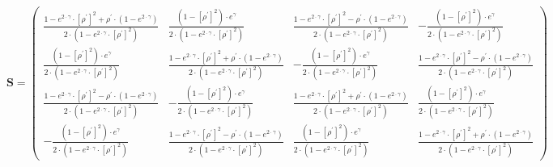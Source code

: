 \[ \mathbf{S} = \left(\begin{smallmatrix} \frac{ 1 - e^{2 \cdot \gamma
}  \cdot \left[ \rho^\prime \right]^2 + \rho^\prime \cdot \left( 1 -
e^{2 \cdot \gamma }  \right) }{ 2 \cdot \left( 1 - e^{2 \cdot \gamma }
\cdot \left[ \rho^\prime \right]^2 \right) }  & \frac{ \left( 1 -
\left[ \rho^\prime \right]^2 \right) \cdot e^{\gamma }  }{ 2 \cdot
\left( 1 - e^{2 \cdot \gamma }  \cdot \left[ \rho^\prime \right]^2
\right) }  & \frac{ 1 - e^{2 \cdot \gamma }  \cdot \left[ \rho^\prime
\right]^2 - \rho^\prime \cdot \left( 1 - e^{2 \cdot \gamma }  \right)
}{ 2 \cdot \left( 1 - e^{2 \cdot \gamma }  \cdot \left[ \rho^\prime
\right]^2 \right) }  & -\frac{ \left( 1 - \left[ \rho^\prime \right]^2
\right) \cdot e^{\gamma }  }{ 2 \cdot \left( 1 - e^{2 \cdot \gamma }
\cdot \left[ \rho^\prime \right]^2 \right) }  \\ \frac{ \left( 1 -
\left[ \rho^\prime \right]^2 \right) \cdot e^{\gamma }  }{ 2 \cdot
\left( 1 - e^{2 \cdot \gamma }  \cdot \left[ \rho^\prime \right]^2
\right) }  & \frac{ 1 - e^{2 \cdot \gamma }  \cdot \left[ \rho^\prime
\right]^2 + \rho^\prime \cdot \left( 1 - e^{2 \cdot \gamma }  \right)
}{ 2 \cdot \left( 1 - e^{2 \cdot \gamma }  \cdot \left[ \rho^\prime
\right]^2 \right) }  & -\frac{ \left( 1 - \left[ \rho^\prime \right]^2
\right) \cdot e^{\gamma }  }{ 2 \cdot \left( 1 - e^{2 \cdot \gamma }
\cdot \left[ \rho^\prime \right]^2 \right) }  & \frac{ 1 - e^{2 \cdot
\gamma }  \cdot \left[ \rho^\prime \right]^2 - \rho^\prime \cdot
\left( 1 - e^{2 \cdot \gamma }  \right)  }{ 2 \cdot \left( 1 - e^{2
\cdot \gamma }  \cdot \left[ \rho^\prime \right]^2 \right) }  \\
\frac{ 1 - e^{2 \cdot \gamma }  \cdot \left[ \rho^\prime \right]^2 -
\rho^\prime \cdot \left( 1 - e^{2 \cdot \gamma }  \right)  }{ 2 \cdot
\left( 1 - e^{2 \cdot \gamma }  \cdot \left[ \rho^\prime \right]^2
\right) }  & -\frac{ \left( 1 - \left[ \rho^\prime \right]^2 \right)
\cdot e^{\gamma }  }{ 2 \cdot \left( 1 - e^{2 \cdot \gamma }  \cdot
\left[ \rho^\prime \right]^2 \right) }  & \frac{ 1 - e^{2 \cdot \gamma
}  \cdot \left[ \rho^\prime \right]^2 + \rho^\prime \cdot \left( 1 -
e^{2 \cdot \gamma }  \right) }{ 2 \cdot \left( 1 - e^{2 \cdot \gamma }
\cdot \left[ \rho^\prime \right]^2 \right) }  & \frac{ \left( 1 -
\left[ \rho^\prime \right]^2 \right) \cdot e^{\gamma }  }{ 2 \cdot
\left( 1 - e^{2 \cdot \gamma }  \cdot \left[ \rho^\prime \right]^2
\right) }  \\ -\frac{ \left( 1 - \left[ \rho^\prime \right]^2 \right)
\cdot e^{\gamma }  }{ 2 \cdot \left( 1 - e^{2 \cdot \gamma }  \cdot
\left[ \rho^\prime \right]^2 \right) }  & \frac{ 1 - e^{2 \cdot \gamma
}  \cdot \left[ \rho^\prime \right]^2 - \rho^\prime \cdot \left( 1 -
e^{2 \cdot \gamma }  \right)  }{ 2 \cdot \left( 1 - e^{2 \cdot \gamma
}  \cdot \left[ \rho^\prime \right]^2 \right) }  & \frac{ \left( 1 -
\left[ \rho^\prime \right]^2 \right) \cdot e^{\gamma }  }{ 2 \cdot
\left( 1 - e^{2 \cdot \gamma }  \cdot \left[ \rho^\prime \right]^2
\right) }  & \frac{ 1 - e^{2 \cdot \gamma }  \cdot \left[ \rho^\prime
\right]^2 + \rho^\prime \cdot \left( 1 - e^{2 \cdot \gamma }  \right)
}{ 2 \cdot \left( 1 - e^{2 \cdot \gamma }  \cdot \left[ \rho^\prime
\right]^2 \right) }  \end{smallmatrix}\right) \]
